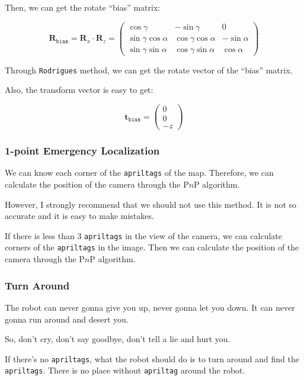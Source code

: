 \documentclass{article}
\begin{document}
Then, we can get the rotate ``bias'' matrix:

\begin{equation}
  \boldsymbol{R}_{\texttt{bias}}=\boldsymbol{R}_x\cdot \boldsymbol{R}_z= \left(
    \begin{matrix}
      \cos\gamma & -\sin\gamma & 0 \\
      \sin\gamma\cos\alpha & \cos\gamma\cos\alpha & -\sin\alpha \\
      \sin\gamma\sin\alpha & \cos\gamma\sin\alpha & \cos\alpha
    \end{matrix}
  \right)
\end{equation}

Through \texttt{Rodrigues} method, we can get the rotate vector of the ``bias'' matrix.

Also, the transform vector is easy to get:

\begin{equation}
  \boldsymbol{t}_{\texttt{bias}}=\left(
    \begin{matrix}
      0 \\
      0 \\
      -z
    \end{matrix}
  \right)
\end{equation}

\subsubsection{1-point Emergency Localization}
We can know each corner of the \texttt{apriltags} of the map. Therefore, we can calculate the position of the camera through the P$n$P algorithm.

However, I strongly recommend that we should not use this method. It is not so accurate and it is easy to make mistakes.

If there is less than $3$ \texttt{apriltags} in the view of the camera, we can calculate corners of the \texttt{apriltags} in the image. Then we can calculate the position of the camera through the P$n$P algorithm.

\subsubsection{Turn Around}
The robot can never gonna give you up, never gonna let you down. It can never gonna run around and desert you.

So, don't cry, don't say goodbye, don't tell a lie and hurt you.

If there's no \texttt{apriltags}, what the robot should do is to turn around and find the \texttt{apriltags}. There is no place without \texttt{apriltag} around the robot.
\end{document}
